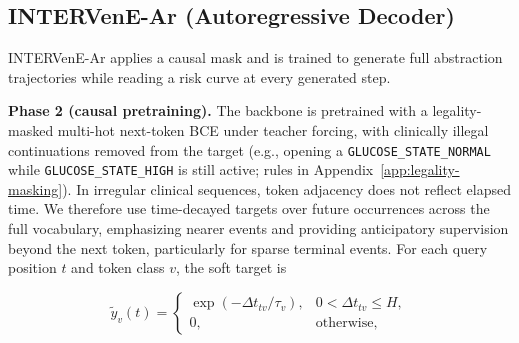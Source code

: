 \documentclass[letterpaper]{article} %
\begin{document}
\subsection{INTERVenE-Ar (Autoregressive Decoder)}

INTERVenE-Ar applies a causal mask and is trained to generate full abstraction trajectories while reading a risk curve at every generated step.

\textbf{Phase 2 (causal pretraining).} The backbone is pretrained with a legality-masked multi-hot next-token BCE under teacher forcing, with clinically illegal continuations removed from the target (e.g., opening a \texttt{GLUCOSE\_STATE\_NORMAL} while \texttt{GLUCOSE\_STATE\_HIGH} is still active; rules in Appendix~\ref{app:legality-masking}). In irregular clinical sequences, token adjacency does not reflect elapsed time. We therefore use time-decayed targets over future occurrences across the full vocabulary, emphasizing nearer events and providing anticipatory supervision beyond the next token, particularly for sparse terminal events. For each query position $t$ and token class $v$, the soft target is

\begin{equation}
  \tilde{y}_v(t) = \begin{cases}
    \exp(-\Delta t_{tv}/\tau_v), & 0<\Delta t_{tv}\le H,\\
    0, & \text{otherwise},
  \end{cases}
\end{equation}
\end{document}
